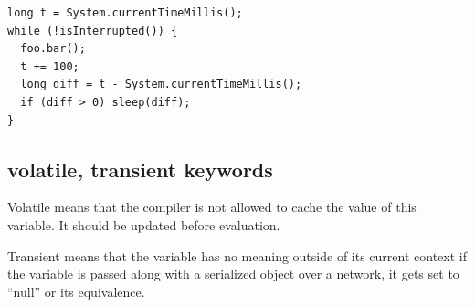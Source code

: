 \documentclass[a4paper]{article}
\begin{document}
\begin{lstlisting}[label=drift-fix,caption=Drift fixed]
long t = System.currentTimeMillis();
while (!isInterrupted()) {
  foo.bar();
  t += 100;
  long diff = t - System.currentTimeMillis();
  if (diff > 0) sleep(diff);
}
\end{lstlisting}

\subsection{volatile, transient keywords}
Volatile means that the compiler is not allowed to cache the value of this
variable. It should be updated before evaluation.

Transient means that the variable has no meaning outside of its current context
if the variable is passed along with a serialized object over a network, it
gets set to ``null'' or its equivalence.
\end{document}
